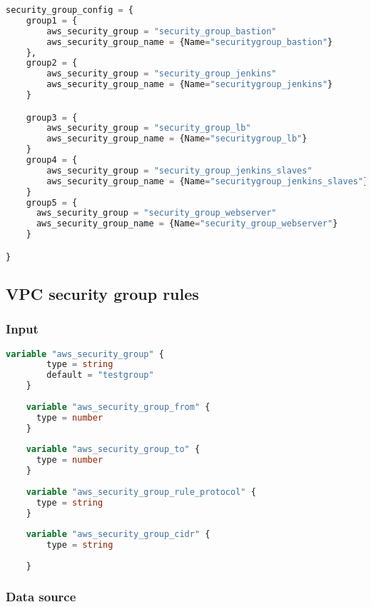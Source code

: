 \begin{lstlisting}[language=terraform]
  security_group_config = {
    group1 = {
        aws_security_group = "security_group_bastion"
        aws_security_group_name = {Name="securitygroup_bastion"}
    },  
    group2 = {
        aws_security_group = "security_group_jenkins"
        aws_security_group_name = {Name="securitygroup_jenkins"}
    }

    group3 = {
        aws_security_group = "security_group_lb"
        aws_security_group_name = {Name="securitygroup_lb"}
    }
    group4 = {
        aws_security_group = "security_group_jenkins_slaves"
        aws_security_group_name = {Name="securitygroup_jenkins_slaves"}
    }
    group5 = {
      aws_security_group = "security_group_webserver"
      aws_security_group_name = {Name="security_group_webserver"}
    }

}
\end{lstlisting}

\subsection{
{VPC security group rules}}
\label{sec:VPC security group regels}

\subsubsection{
{Input}}

\begin{lstlisting}[language=terraform]
    variable "aws_security_group" {
        type = string
        default = "testgroup"
    }
    
    variable "aws_security_group_from" {
      type = number
    }
    
    variable "aws_security_group_to" {
      type = number
    }
    
    variable "aws_security_group_rule_protocol" {
      type = string
    }
    
    variable "aws_security_group_cidr" {
        type = string
      
    }   
\end{lstlisting}

\subsubsection{
{Data source}}


